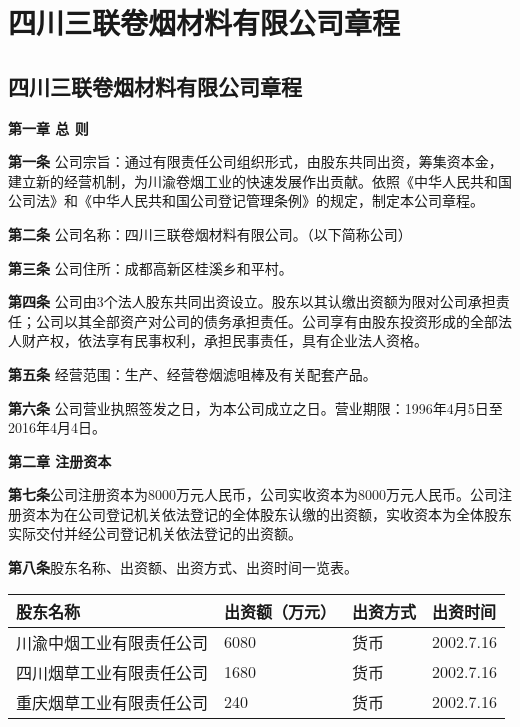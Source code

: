 ﻿\chapter{四川三联卷烟材料有限公司章程}\label{app:appendix0-1}
\section{四川三联卷烟材料有限公司章程}
\begin{center}
\textbf{第一章 \quad  总  则}
\end{center}

\textbf{第一条 }\quad 公司宗旨：通过有限责任公司组织形式，由股东共同出资，筹集资本金，建立新的经营机制，为川渝卷烟工业的快速发展作出贡献。依照《中华人民共和国公司法》和《中华人民共和国公司登记管理条例》的规定，制定本公司章程。

\textbf{第二条} \quad 公司名称：四川三联卷烟材料有限公司。（以下简称公司）

\textbf{第三条} \quad 公司住所：成都高新区桂溪乡和平村。

\textbf{第四条} \quad 公司由3个法人股东共同出资设立。股东以其认缴出资额为限对公司承担责任；公司以其全部资产对公司的债务承担责任。公司享有由股东投资形成的全部法人财产权，依法享有民事权利，承担民事责任，具有企业法人资格。

\textbf{第五条} \quad 经营范围：生产、经营卷烟滤咀棒及有关配套产品。

\textbf{第六条} \quad 公司营业执照签发之日，为本公司成立之日。营业期限：1996年4月5日至2016年4月4日。


\begin{center}
\textbf{第二章 \quad  注册资本}
\end{center}

\textbf{第七条}\quad  公司注册资本为8000万元人民币，公司实收资本为8000万元人民币。公司注册资本为在公司登记机关依法登记的全体股东认缴的出资额，实收资本为全体股东实际交付并经公司登记机关依法登记的出资额。

\textbf{第八条}\quad  股东名称、出资额、出资方式、出资时间一览表。

 \begin{table}[!htbp]
    \renewcommand{\arraystretch}{1.3}
    \centering
     \begin{tabular}
  {>{\sf }p{}<{\centering}p{}<{\centering}p{}<{\centering}p{}<{\centering}}
   \toprule[1pt]
  \sf 股东名称 & \sf 出资额（万元） & \sf 出资方式 & \sf 出资时间 \\
\midrule
川渝中烟工业有限责任公司 & 6080& 货币& 2002.7.16  \\
四川烟草工业有限责任公司 & 1680 & 货币 & 2002.7.16  \\
重庆烟草工业有限责任公司 & 240 & 货币 & 2002.7.16  \\
\bottomrule[1pt]
    \end{tabular}
    \end{table}




